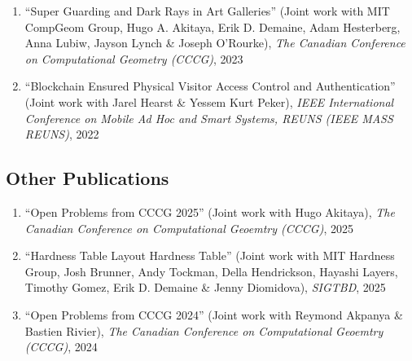 \documentclass[letterpaper,11pt]{article}
\makeatletter
\newcommand{\resumeSubHeadingListStart}{\begin{itemize}[leftmargin=*]}
\newcommand{\resumeSubHeadingListEnd}{\end{itemize}}
\newcommand{\publication}[6]{
  \item ``#1'' %
   (Joint work with#2), %
     \emph{#3}, %
      #4%


}
\newcommand{\pdficon}{\faFilePdf}
\makeatother
\begin{document}
\begin{enumerate}
        \publication
          {Super Guarding and Dark Rays in Art Galleries}
          {
 MIT CompGeom Group, Hugo A. Akitaya, Erik D. Demaine, Adam Hesterberg, Anna Lubiw, Jayson Lynch \& Joseph O'Rourke}
          {The Canadian Conference on Computational Geometry (CCCG)}
          {2023}
          {%
\href{https://arxiv.org/pdf/2404.04613}{\pdficon}%
%
%
          }
          {11}
 \vspace{-.5em}  
      
        \publication
          {Blockchain Ensured Physical Visitor Access Control and Authentication}
          {
 Jarel Hearst \& Yessem Kurt Peker}
          {IEEE International Conference on Mobile Ad Hoc and Smart Systems, REUNS (IEEE MASS REUNS)}
          {2022}
          {%
\href{https://par.nsf.gov/servlets/purl/10376999}{\pdficon}%
%
%
          }
          {12}
 
    \setcounter{pubnum}{\value{enumi}}
    \end{enumerate}
    \subsection*{Other Publications}%
  
    \begin{enumerate}
    \setcounter{enumi}{\value{pubnum}}
      
        \publication
          {Open Problems from CCCG 2025}
          {
 Hugo Akitaya}
          {The Canadian Conference on Computational Geoemtry (CCCG)}
          {2025}
          {%
%
%
%
          }
          {1}
 \vspace{-.5em}  
      
        \publication
          {Hardness Table Layout Hardness Table}
          {
 MIT Hardness Group, Josh Brunner, Andy Tockman, Della Hendrickson, Hayashi Layers, Timothy Gomez, Erik D. Demaine \& Jenny Diomidova}
          {SIGTBD}
          {2025}
          {%
%
%
%
          }
          {2}
 \vspace{-.5em}  
      
        \publication
          {Open Problems from CCCG 2024}
          {
 Reymond Akpanya \& Bastien Rivier}
          {The Canadian Conference on Computational Geoemtry (CCCG)}
          {2024}
          {%
%
%
%
          }
          {3}
 
    \setcounter{pubnum}{\value{enumi}}
    \end{enumerate}
\end{document}

